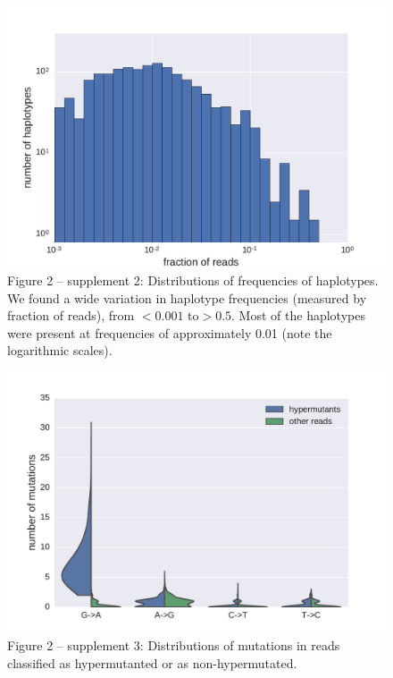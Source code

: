 \documentclass[aps,rmp,onecolumn,linenumbers]{revtex4-1}
\begin{document}
\begin{figure}[hb]
\centering
\includegraphics[width=0.7\columnwidth]{figures/fig2_S2}
\caption{Figure 2 -- supplement 2: Distributions of frequencies of haplotypes. We found a wide variation in haplotype frequencies (measured by fraction of reads), from $<0.001$ to$ >0.5$. Most of the haplotypes were present at frequencies of approximately 0.01 (note the logarithmic scales). }
\label{fig:haplo_frequencies}
\end{figure}
\begin{figure}[hb]
\centering
\includegraphics[width=0.7\columnwidth]{figures/fig2_S3}
\caption{Figure 2 -- supplement 3: Distributions of mutations in reads classified as hypermutanted or as non-hypermutated.}
\label{fig:hypermuts}
\end{figure}
\clearpage
\end{document}
